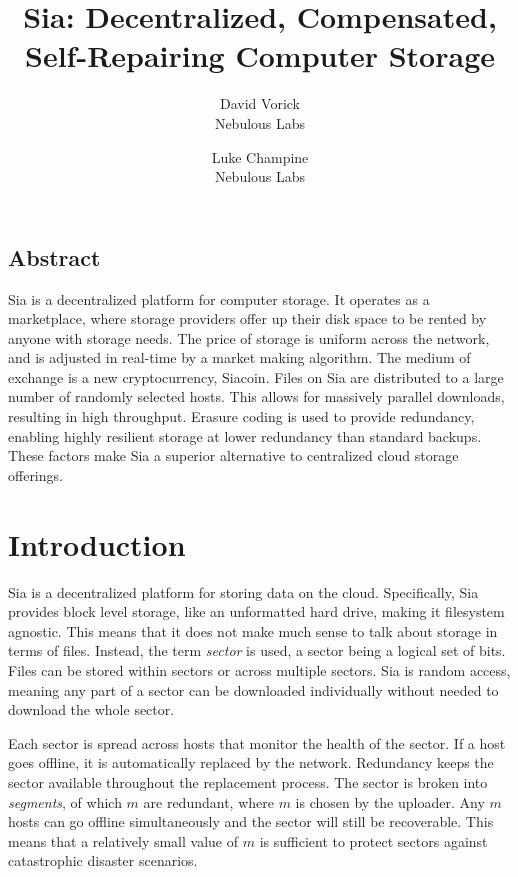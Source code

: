 \documentclass[twocolumn]{article}
\begin{document}
\frenchspacing

\title{Sia: Decentralized, Compensated, Self-Repairing Computer Storage}

\author{
{\rm David Vorick}\\
Nebulous Labs
\and
{\rm Luke Champine}\\
Nebulous Labs
}

\maketitle

\subsection*{Abstract}
Sia is a decentralized platform for computer storage.
It operates as a marketplace, where storage providers offer up their disk space to be rented by anyone with storage needs.
The price of storage is uniform across the network, and is adjusted in real-time by a market making algorithm.
The medium of exchange is a new cryptocurrency, Siacoin.
Files on Sia are distributed to a large number of randomly selected hosts.
This allows for massively parallel downloads, resulting in high throughput.
Erasure coding is used to provide redundancy, enabling highly resilient storage at lower redundancy than standard backups.
These factors make Sia a superior alternative to centralized cloud storage offerings.

\section{Introduction}
Sia is a decentralized platform for storing data on the cloud.
Specifically, Sia provides block level storage, like an unformatted hard drive, making it filesystem agnostic.
This means that it does not make much sense to talk about storage in terms of files.
Instead, the term \textit{sector} is used, a sector being a logical set of bits.
Files can be stored within sectors or across multiple sectors.
Sia is random access, meaning any part of a sector can be downloaded individually without needed to download the whole sector.

Each sector is spread across \quorumsize{} hosts that monitor the health of the sector.
If a host goes offline, it is automatically replaced by the network.
Redundancy keeps the sector available throughout the replacement process.
The sector is broken into \quorumsize{} \textit{segments}, of which \(m\) are redundant, where \(m\) is chosen by the uploader.
Any \(m\) hosts can go offline simultaneously and the sector will still be recoverable.
This means that a relatively small value of \(m\) is sufficient to protect sectors against catastrophic disaster scenarios.
\end{document}
